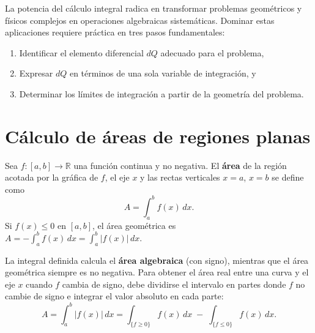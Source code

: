 \begin{rem}
La potencia del cálculo integral radica en transformar problemas
geométricos y físicos complejos en operaciones algebraicas sistemáticas.
Dominar estas aplicaciones requiere práctica en tres pasos fundamentales:
\begin{enumerate}
\item Identificar el elemento diferencial $dQ$ adecuado para el problema,
\item Expresar $dQ$ en términos de una sola variable de integración, y
\item Determinar los límites de integración a partir de la geometría del
problema.
\end{enumerate}
\end{rem}

\section{Cálculo de áreas de regiones planas}

\begin{definition}
Sea $f:[a,b]\to\mathbb{R}$ una función continua y no negativa. El
\textbf{área} de la región acotada por la gráfica de $f$, el eje $x$ y las
rectas verticales $x=a$, $x=b$ se define como
\[
  A = \int_a^b f(x)\,dx.
\]
Si $f(x)\leq 0$ en $[a,b]$, el área geométrica es
$A = -\int_a^b f(x)\,dx = \int_a^b |f(x)|\,dx$.
\end{definition}

\begin{rem}
La integral definida calcula el \textbf{área algebraica} (con signo),
mientras que el área geométrica siempre es no negativa. Para obtener el
área real entre una curva y el eje $x$ cuando $f$ cambia de signo, debe
dividirse el intervalo en partes donde $f$ no cambie de signo e integrar
el valor absoluto en cada parte:
\[
  A = \int_a^b |f(x)|\,dx
      = \int_{\{f\ge 0\}} f(x)\,dx \;-\; \int_{\{f\le 0\}} f(x)\,dx.
\]
\end{rem}

